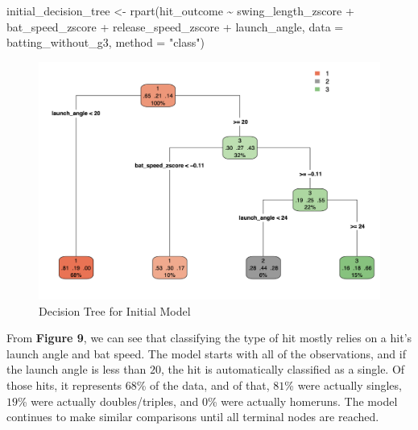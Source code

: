 \documentclass[
  letterpaper,
  DIV=11,
  numbers=noendperiod]{scrartcl}
\newenvironment{Shaded}{\begin{snugshade}}{\end{snugshade}}
\newcommand{\AttributeTok}[1]{\textcolor[rgb]{0.40,0.45,0.13}{#1}}
\newcommand{\FunctionTok}[1]{\textcolor[rgb]{0.28,0.35,0.67}{#1}}
\newcommand{\NormalTok}[1]{\textcolor[rgb]{0.00,0.23,0.31}{#1}}
\newcommand{\OtherTok}[1]{\textcolor[rgb]{0.00,0.23,0.31}{#1}}
\newcommand{\SpecialCharTok}[1]{\textcolor[rgb]{0.37,0.37,0.37}{#1}}
\newcommand{\StringTok}[1]{\textcolor[rgb]{0.13,0.47,0.30}{#1}}
\begin{document}
\begin{Shaded}
\begin{Highlighting}[]
\NormalTok{initial\_decision\_tree }\OtherTok{\textless{}{-}} \FunctionTok{rpart}\NormalTok{(hit\_outcome }\SpecialCharTok{\textasciitilde{}} 
\NormalTok{                                 swing\_length\_zscore }\SpecialCharTok{+}
\NormalTok{                                 bat\_speed\_zscore }\SpecialCharTok{+}
\NormalTok{                                 release\_speed\_zscore }\SpecialCharTok{+}
\NormalTok{                                 launch\_angle,}
                               \AttributeTok{data =}\NormalTok{ batting\_without\_g3,}
                               \AttributeTok{method =} \StringTok{"class"}\NormalTok{)}
\end{Highlighting}
\end{Shaded}

\begin{figure}[H]

{\centering \includegraphics{./images/figures/fig9.png}

}

\caption{Decision Tree for Initial Model}

\end{figure}%

From \textbf{Figure 9}, we can see that classifying the type of hit
mostly relies on a hit's launch angle and bat speed. The model starts
with all of the observations, and if the launch angle is less than
\(20\), the hit is automatically classified as a single. Of those hits,
it represents \(68\)\% of the data, and of that, \(81\)\% were actually
singles, \(19\)\% were actually doubles/triples, and \(0\)\% were
actually homeruns. The model continues to make similar comparisons until
all terminal nodes are reached.
\end{document}
